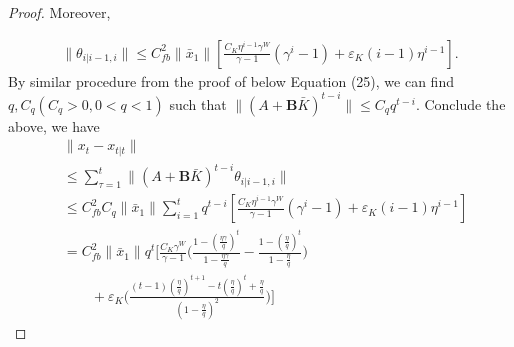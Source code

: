 \documentclass[letterpaper, 10 pt, conference]{ieeeconf}  %
\begin{document}
\begin{proof}
Moreover,

\begin{align*}
    \|\theta_{i|i-1,i}\| \leq C_{fb}^{2}\|\bar{x}_{1}\|[\frac{C_{K}\eta^{i-1}\gamma^{W}}{\gamma-1}(\gamma^{i}-1) + \varepsilon_{K}(i-1)\eta^{i-1}].
\end{align*}
By similar procedure from the proof of \cite[Lemma 10]{chen_regret_2022} below Equation (25), we can find $q,C_{q}(C_{q}>0,0<q<1)$ such that $\|(A+\mathbf{B}\bar{K})^{t-i}\| \leq C_{q}q^{t-i}$. Conclude the above, we have
\begin{align*}
    &\|x_{t}-x_{t|t}\|\\
    &\leq \sum_{\tau=1}^{t}\|(A+\mathbf{B}\bar{K})^{t-i}\theta_{i|i-1,i}\|\\
    &\leq C_{fb}^{2}C_{q}\|\bar{x}_{1}\|\sum_{i=1}^{t}q^{t-i}[\frac{C_{K}\eta^{i-1}\gamma^{W}}{\gamma-1}(\gamma^{i}-1) + \varepsilon_{K}(i-1)\eta^{i-1}]\\
    &= C_{fb}^{2}\|\bar{x}_{1}\|q^{t}[\frac{C_{K}\gamma^{W}}{\gamma-1}\bigg(\frac{1-(\frac{\eta\gamma}{q})^{t}}{1-\frac{\eta\gamma}{q}} - \frac{1-(\frac{\eta}{q})^{t}}{1-\frac{\eta}{q}} \bigg)\\
    &\qquad+\varepsilon_{K}\bigg(\frac{(t-1)(\frac{\eta}{q})^{t+1}-t(\frac{\eta}{q})^{t}+\frac{\eta}{q}}{(1-\frac{\eta}{q})^{2}}\bigg)]
\end{align*}
\end{proof}
\end{document}
